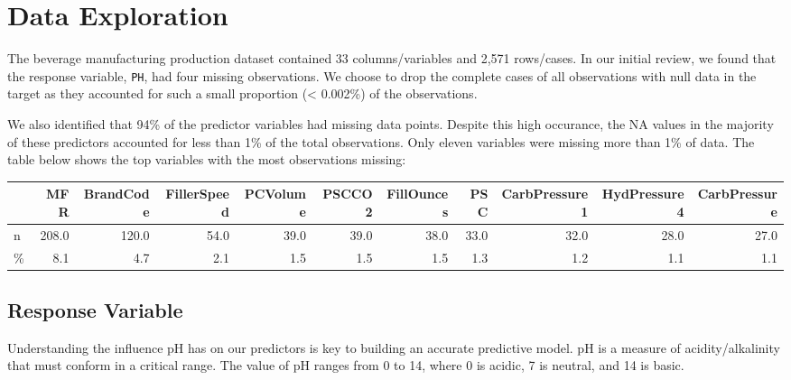 \documentclass[]{report}
\begin{document}
\hypertarget{data-exploration}{%
\chapter{Data Exploration}\label{data-exploration}}

The beverage manufacturing production dataset contained 33
columns/variables and 2,571 rows/cases. In our initial review, we found
that the response variable, \texttt{PH}, had four missing observations.
We choose to drop the complete cases of all observations with null data
in the target as they accounted for such a small proportion (\textless{}
0.002\%) of the observations.

We also identified that 94\% of the predictor variables had missing data
points. Despite this high occurance, the NA values in the majority of
these predictors accounted for less than 1\% of the total observations.
Only eleven variables were missing more than 1\% of data. The table
below shows the top variables with the most observations missing:

\begin{table}[H]
\centering\begingroup\fontsize{8}{10}\selectfont

\begin{tabular}{lrrrrrrrrrr}
\toprule
\textbf{ } & \textbf{MFR} & \textbf{BrandCode} & \textbf{FillerSpeed} & \textbf{PCVolume} & \textbf{PSCCO2} & \textbf{FillOunces} & \textbf{PSC} & \textbf{CarbPressure1} & \textbf{HydPressure4} & \textbf{CarbPressure}\\
\midrule
\rowcolor{gray!6}  n & 208.0 & 120.0 & 54.0 & 39.0 & 39.0 & 38.0 & 33.0 & 32.0 & 28.0 & 27.0\\
\% & 8.1 & 4.7 & 2.1 & 1.5 & 1.5 & 1.5 & 1.3 & 1.2 & 1.1 & 1.1\\
\bottomrule
\end{tabular}
\endgroup{}
\end{table}

\hypertarget{response-variable}{%
\section{Response Variable}\label{response-variable}}

Understanding the influence pH has on our predictors is key to building
an accurate predictive model. pH is a measure of acidity/alkalinity that
must conform in a critical range. The value of pH ranges from 0 to 14,
where 0 is acidic, 7 is neutral, and 14 is basic.

\newpage
\end{document}
